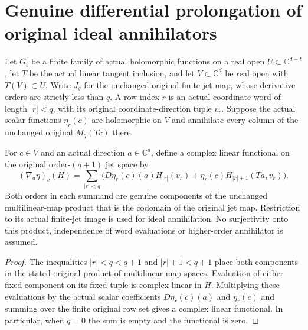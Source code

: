 \section{Genuine differential prolongation of original ideal annihilators}

Let $G_i$ be a finite family of actual holomorphic functions on a real
open $U\subset\mathbb C^{d+t}$, let $T$ be the actual linear tangent
inclusion, and let $V\subset\mathbb C^d$ be real open with
$T(V)\subset U$. Write $J_q$ for the unchanged original finite jet
map, whose derivative orders are strictly less than $q$. A row index
$r$ is an actual coordinate word of length $|r|<q$, with its original
coordinate-direction tuple $v_r$. Suppose the actual scalar functions
$\eta_r(c)$ are holomorphic on $V$ and annihilate every column of the
unchanged original $M_q(Tc)$ there.

\begin{definition}
\label{hir:actual-dual-jet-differential-prolongation}
\leanok
For $c\in V$ and an actual direction $a\in\mathbb C^d$, define a
complex linear functional on the original order-$(q+1)$ jet space by
\[
 (\nabla_a\eta)_c(H)=\sum_{|r|<q}
 \bigl(D\eta_r(c)(a)H_{|r|}(v_r)+
       \eta_r(c)H_{|r|+1}(Ta,v_r)\bigr).
\]
Both orders in each summand are genuine components of the unchanged
multilinear-map product that is the codomain of the original jet map.
Restriction to its actual finite-jet image is used for ideal
annihilation. No surjectivity onto this product, independence of word
evaluations or higher-order annihilator is assumed.
\end{definition}
\begin{proof}
The inequalities $|r|<q<q+1$ and $|r|+1<q+1$ place both components
in the stated original product of multilinear-map spaces. Evaluation
of either fixed component on its fixed tuple is complex linear in
$H$. Multiplying these evaluations by the actual scalar coefficients
$D\eta_r(c)(a)$ and $\eta_r(c)$ and summing over the finite original
row set gives a complex linear functional. In particular, when
$q=0$ the sum is empty and the functional is zero.
\end{proof}

